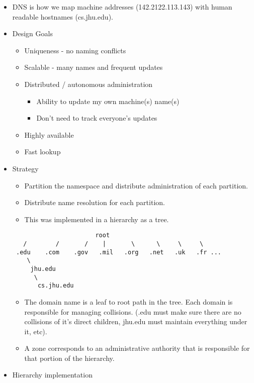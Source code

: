 \documentclass[]{article}
\providecommand{\tightlist}{%
  \setlength{\itemsep}{0pt}\setlength{\parskip}{0pt}}
\begin{document}
\begin{itemize}
\tightlist
\item
  DNS is how we map machine addresses (142.2122.113.143) with human
  readable hostnames (cs.jhu.edu).
\item
  Design Goals

  \begin{itemize}
  \tightlist
  \item
    Uniqueness - no naming conflicts
  \item
    Scalable - many names and frequent updates
  \item
    Distributed / autonomous administration

    \begin{itemize}
    \tightlist
    \item
      Ability to update my own machine(s) name(s)
    \item
      Don't need to track everyone's updates
    \end{itemize}
  \item
    Highly available
  \item
    Fast lookup
  \end{itemize}
\item
  Strategy

  \begin{itemize}
  \tightlist
  \item
    Partition the namespace and distribute administration of each
    partition.
  \item
    Distribute name resolution for each partition.
  \item
    This was implemented in a hierarchy as a tree.
  \end{itemize}

\begin{verbatim}
                       root
   /        /       /    |       \      \     \     \
 .edu    .com    .gov   .mil   .org   .net   .uk   .fr ...
    \
     jhu.edu 
      \
       cs.jhu.edu
\end{verbatim}

  \begin{itemize}
  \tightlist
  \item
    The domain name is a leaf to root path in the tree. Each domain is
    responsible for managing collisions. (.edu must make sure there are
    no collisions of it's direct children, jhu.edu must maintain
    everything under it, etc).
  \item
    A zone corresponds to an administrative authority that is
    responsible for that portion of the hierarchy.
  \end{itemize}
\item
  Hierarchy implementation


\end{itemize}
\end{document}
